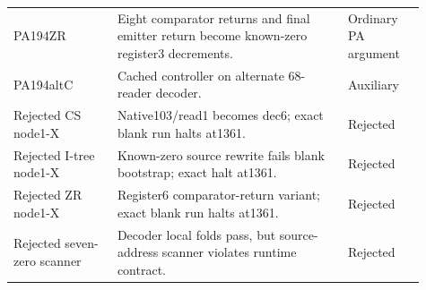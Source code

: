 \begin{longtable}{p{0.23\linewidth}p{0.51\linewidth}p{0.17\linewidth}}
PA194ZR & Eight comparator returns and final emitter return become known-zero register3 decrements. & Ordinary PA argument\\
PA194altC & Cached controller on alternate 68-reader decoder. & Auxiliary\\
Rejected CS node1-X & Native103/read1 becomes dec6; exact blank run halts at1361. & Rejected\\
Rejected I-tree node1-X & Known-zero source rewrite fails blank bootstrap; exact halt at1361. & Rejected\\
Rejected ZR node1-X & Register6 comparator-return variant; exact blank run halts at1361. & Rejected\\
Rejected seven-zero scanner & Decoder local folds pass, but source-address scanner violates runtime contract. & Rejected\\
\bottomrule
\end{longtable}
